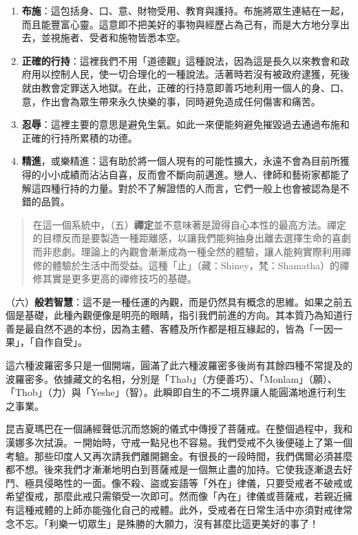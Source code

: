 \begin{enumerate}
\item
  \textbf{布施}：這包括身、口、意、財物受用、教育與護持。布施將眾生連結在一起，而且能豐富心靈。這意即不把美好的事物與經歷占為己有，而是大方地分享出去，並視施者、受者和施物皆悉本空。
\item
  \textbf{正確的行持}：這裡我們不用「道德觀」這種說法，因為這是長久以來教會和政府用以控制人民，使一切合理化的一種說法。活著時若沒有被政府逮獲，死後就由教會定罪送入地獄。在此，正確的行持意即善巧地利用一個人的身、口、意，作出會為眾生帶來永久快樂的事，同時避免造成任何傷害和痛苦。
\item
  \textbf{忍辱}：這裡主要的意思是避免生氣。如此一來便能夠避免摧毀過去通過布施和正確的行持所累積的功德。
\item
  \textbf{精進}，或樂精進：這有助於將一個人現有的可能性擴大，永遠不會為目前所獲得的小小成績而沾沾自喜，反而會不斷向前邁進。戀人、律師和藝術家都能了解這四種行持的力量。對於不了解證悟的人而言，它們一般上也會被認為是不錯的品質。
\end{enumerate}

\begin{quote}
在這一個系統中，（五）\textbf{禪定}並不意味著是證得自心本性的最高方法。禪定的目標反而是要製造一種距離感，以讓我們能夠抽身出離去選擇生命的喜劇而非悲劇。理論上的內觀會漸漸成為一種全然的體驗，讓人能夠實際利用禪修的體驗於生活中而受益。這種「止」（藏：Shiney，梵：Shamatha）的禪修其實是更多更高的禪修技巧的基礎。
\end{quote}

（六）\textbf{般若智慧}：這不是一種任運的內觀，而是仍然具有概念的思維。如果之前五個是基礎，此種內觀便像是明亮的眼睛，指引我們前進的方向。其本質乃為知道行善是最自然不過的本份，因為主體、客體及所作都是相互緣起的，皆為「一因一果」，「自作自受」。

這六種波羅密多只是一個開端，圓滿了此六種波羅密多後尚有其餘四種不常提及的波羅密多。依據藏文的名相，分別是「Thab」（方便善巧）、「Monlam」（願）、「Thob」（力）與「Yeshe」（智）。此瞬即自生的不二境界讓人能圓滿地進行利生之事業。

昆吉夏瑪巴在一個誦經聲低沉而悠婉的儀式中傳授了菩薩戒。在整個過程中，我和漢娜多次拭淚。ㄧ開始時，守戒一點兒也不容易。我們受戒不久後便碰上了第一個考驗。那些印度人又再次請我們離開錫金。有很長的一段時間，我們偶爾必須甚麼都不想。後來我們才漸漸地明白到菩薩戒是一個無止盡的加持。它使我逐漸退去好鬥、極具侵略性的一面。像不殺、盜或妄語等「外在」律儀，只要受戒者不破戒或希望復戒，那麼此戒只需領受一次即可。然而像「內在」律儀或菩薩戒，若親近擁有這種戒體的上師亦能強化自己的戒體。此外，受戒者在日常生活中亦須對戒律常念不忘。「利樂一切眾生」是殊勝的大願力，沒有甚麼比這更美好的事了！


